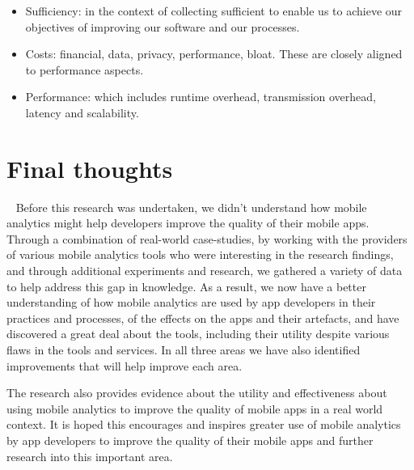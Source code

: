 \begin{itemize}
    \item Sufficiency: in the context of collecting sufficient to enable us to achieve our objectives of improving our software and our processes.    
    \item Costs: financial, data, privacy, performance, bloat. These are closely aligned to performance aspects.
    \item Performance: which includes runtime overhead, transmission overhead, latency and scalability.
\end{itemize}


\section{Final thoughts}~\label{final-thoughts-to-the-thesis}
Before this research was undertaken, we didn't understand how mobile analytics might help developers improve the quality of their mobile apps. Through a combination of real-world case-studies, by working with the providers of various mobile analytics tools who were interesting in the research findings, and through additional experiments and research, we gathered a variety of data to help address this gap in knowledge. As a result, we now have a better understanding of how mobile analytics are used by app developers in their practices and processes, of the effects on the apps and their artefacts, and have discovered a great deal about the tools, including their utility despite various flaws in the tools and services. In all three areas we have also identified improvements that will help improve each area.

The research also provides evidence about the utility and effectiveness about using mobile analytics to improve the quality of mobile apps in a real world context. It is hoped this encourages and inspires greater use of mobile analytics by app developers to improve the quality of their mobile apps and further research into this important area.
